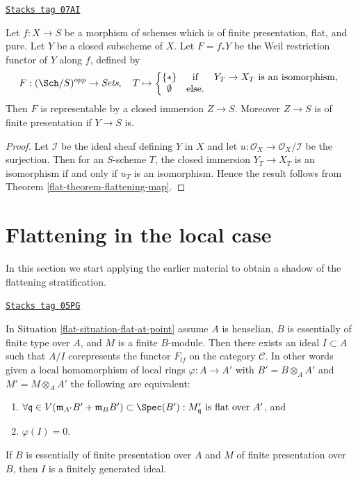 \begin{lemma}
\label{flat-lemma-Weil-restriction-closed-subschemes}
\href{https://stacks.math.columbia.edu/tag/07AI}{\texttt{Stacks tag 07AI}}

Let $f:X\to S$ be a morphism of schemes which is of finite presentation,
flat, and pure. Let $Y$ be a closed subscheme of $X$. Let $F=f_*Y$ be the
Weil restriction functor of $Y$ along $f$, defined by
$$
F : (\Sch/S)^{opp} \to \textit{Sets}, \quad
T \mapsto
\left\{
\begin{matrix}
\{*\} & \text{if} & Y_T\to X_T \text{ is an isomorphism, }\\
\emptyset & \text{else.} &
\end{matrix}
\right.
$$
Then $F$ is representable by a closed immersion $Z\to S$. Moreover
$Z\to S$ is of finite presentation if $Y\to S$ is.
\end{lemma}

\begin{proof}

Let $\mathcal{I}$ be the ideal sheaf defining $Y$ in $X$ and let
$u:\mathcal{O}_X\to\mathcal{O}_X/\mathcal{I}$ be the surjection.
Then for an $S$-scheme $T$, the closed immersion $Y_T\to X_T$
is an isomorphism if and only if $u_T$ is an isomorphism. Hence
the result follows from
Theorem \ref{flat-theorem-flattening-map}.
\end{proof}

\section{Flattening in the local case}
\label{flat-section-flattening-local}
In this section we start applying the earlier material to obtain a
shadow of the flattening stratification.

\begin{theorem}
\label{flat-theorem-flattening-local}
\href{https://stacks.math.columbia.edu/tag/05PG}{\texttt{Stacks tag 05PG}}

In
Situation \ref{flat-situation-flat-at-point}
assume $A$ is henselian, $B$ is essentially of finite type over $A$, and
$M$ is a finite $B$-module. Then there exists an ideal
$I \subset A$ such that $A/I$ corepresents the functor $F_{lf}$ on the category
$\mathcal{C}$. In other words given a local homomorphism of local rings
$\varphi : A \to A'$ with $B' = B \otimes_A A'$ and $M' = M \otimes_A A'$
the following are equivalent:
\begin{enumerate}
\item $\forall \mathfrak q \in V(\mathfrak m_{A'}B' + \mathfrak m_B B')
\subset \Spec(B') :
M'_{\mathfrak q}\text{ is flat over }A'$, and
\item $\varphi(I) = 0$.
\end{enumerate}
If $B$ is essentially of finite presentation over $A$ and $M$
of finite presentation over $B$, then $I$ is a finitely generated ideal.
\end{theorem}

